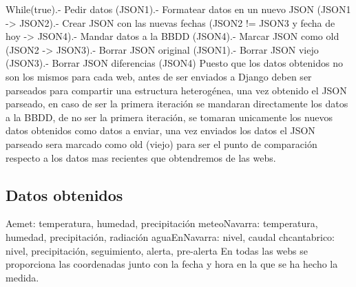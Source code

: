 While(true).- Pedir datos (JSON1).- Formatear datos en un nuevo JSON (JSON1 -> JSON2).- Crear JSON con las nuevas fechas (JSON2 != JSON3 y fecha de hoy -> JSON4).- Mandar datos a la BBDD (JSON4).- Marcar JSON como old (JSON2 -> JSON3).- Borrar JSON original (JSON1).- Borrar JSON viejo (JSON3).- Borrar JSON diferencias (JSON4)\newline
\newline
\newline
Puesto que los datos obtenidos no son los mismos para cada web, antes de ser enviados a Django deben ser parseados para compartir una estructura heterogénea, una vez obtenido el JSON parseado, en caso de ser la primera iteración se mandaran directamente los datos a la BBDD, de no ser la primera iteración, se tomaran unicamente los nuevos datos obtenidos como datos a enviar, una vez enviados los datos el JSON parseado sera marcado como old (viejo) para ser el punto de comparación respecto a los datos mas recientes que obtendremos de las webs.

\subsection{Datos obtenidos}
Aemet:\newline
temperatura, humedad, precipitación
\newline\newline
meteoNavarra:\newline
temperatura, humedad, precipitación, radiación
\newline\newline
aguaEnNavarra:\newline
nivel, caudal
\newline\newline
chcantabrico:\newline
nivel, precipitación, seguimiento, alerta, pre-alerta
\newline\newline
En todas las webs se proporciona las coordenadas junto con la fecha y hora en la que se ha hecho la medida.

